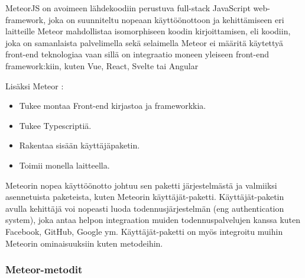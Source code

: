 









MeteorJS on avoimeen lähdekoodiin perustuva full-stack JavaScript web-framework, joka on 
suunniteltu nopeaan käyttöönottoon ja kehittämiseen eri laitteille
Meteor mahdollistaa isomorphiseen koodin kirjoittamisen, eli koodiin, joka on samanlaista palvelimella sekä selaimella %
Meteor ei määritä käytettyä front-end teknologiaa vaan sillä on integraatio moneen yleiseen front-end framework:kiin, kuten Vue, React, Svelte tai Angular
\medskip



    

Lisäksi Meteor :
\begin{itemize}
    \item Tukee montaa Front-end kirjastoa ja frameworkkia.
    \item Tukee Typescriptiä.
    \item Rakentaa sisään käyttäjäpaketin.
    \item Toimii monella laitteella.
\end{itemize}
\medskip


Meteorin nopea käyttöönotto johtuu sen paketti järjestelmästä ja valmiiksi asennetuista paketeista, kuten Meteorin käyttäjät-paketti. 
Käyttäjät-paketin avulla kehittäjä voi nopeasti luoda todennusjärjestelmän (eng authentication system),
joka antaa helpon integraation muiden todennuspalvelujen kanssa kuten Facebook, GitHub, Google ym.
Käyttäjät-paketti on myös integroitu muihin Meteorin ominaisuuksiin kuten metodeihin.



\subsubsection{Meteor-metodit}

